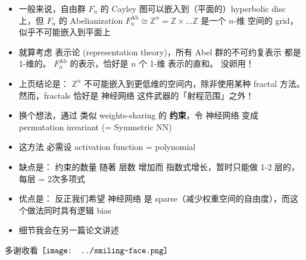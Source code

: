 \documentclass[15pt]{beamer}
\newcommand{\red}[1]{{\color{red}#1}}
\renewcommand{\smiley}{$\vcenter{\hbox{\texttt{[image: ../smiling-face.png]}}}$}
\begin{document}
\begin{frame}
\begin{itemize}
\begin{equation}
		\end{equation}
	\item 一般来说，自由群 $F_n$ 的 Cayley 图可以嵌入到（平面的）hyperbolic disc 上，但 $F_n$ 的 Abelianization $F_n^{\text{Ab}} \cong \mathbb{Z}^n = \mathbb{Z} \times ... \mathbb{Z}$ 是一个 \red{$n$-维} 空间的 grid，似乎不可能嵌入到平面上
	\item 就算考虑 表示论 (representation theory)，所有 Abel 群的不可约复表示 都是 1-维的。 $F_n^{\text{Ab}}$ 的表示，恰好是 $n$ 个 1-维 表示的直和。 没卵用！
\end{itemize}
\end{frame}

\begin{frame}[plain]
\begin{itemize}
	\item 上页结论是： $\mathbb{Z}^n$ 不可能嵌入到更低维的空间内，除非使用某种 \red{fractal} 方法。  然而，fractals 恰好是 神经网络 这件武器的「射程范围」之外！ 
	\item 换个想法，通过 类似 weights-sharing 的 \textbf{约束}，令 神经网络 变成 permutation invariant (= \red{Symmetric NN})
	\item 这方法 必需设 activation function = polynomial
	\item 缺点是： 约束的数量 随著 层数 增加而 指数式增长，暂时只能做 1-2 层的，每层 = 2次多项式
	\item 优点是： 反正我们希望 神经网络 是 sparse（减少权重空间的自由度），而这个做法同时具有逻辑 bias
	\item 细节我会在另一篇论文讲述
\end{itemize}
\printbibliography
\begin{center}
	多谢收看 \smiley
\end{center}
\end{frame}

\end{document}
